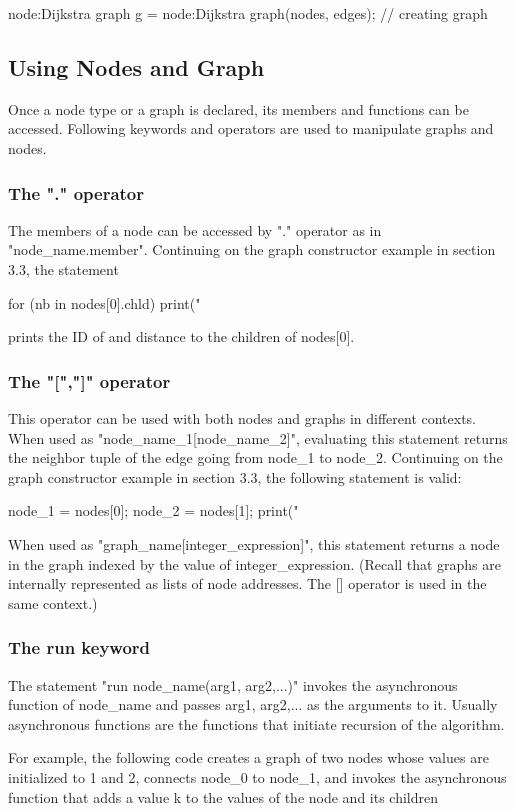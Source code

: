 \documentclass{article}
\begin{document}
node:Dijkstra graph g = node:Dijkstra graph(nodes, edges); // creating graph
\subsection{Using Nodes and Graph}
Once a node type or a graph is declared, its members and functions can be accessed. Following keywords and operators are used to manipulate graphs and nodes.
\subsubsection{The "." operator}
The members of a node can be accessed by "." operator as in "node\_name.member". Continuing on the graph constructor example in section 3.3, the statement

for (nb in nodes[0].chld){
    print("%
}

prints the ID of and distance to the children of nodes[0].
\subsubsection{The "[","]" operator}
This operator can be used with both nodes and graphs in different contexts.
When used as "node\_name\_1[node\_name\_2]", evaluating this statement returns
the neighbor tuple of the edge going from node\_1 to node\_2. Continuing on the graph constructor example in section 3.3, the following statement is valid:

node\_1 = nodes[0];
node\_2 = nodes[1];
print("%

When used as "graph\_name[integer\_expression]", this statement returns a node
in the graph indexed by the value of integer\_expression. (Recall that graphs are internally represented as lists of node addresses. The [] operator is used in the same context.)
\subsubsection{The run keyword}
The statement "run node\_name(arg1, arg2,...)" invokes the asynchronous
function of node\_name and passes arg1, arg2,... as the arguments to it. Usually asynchronous functions are the functions that initiate recursion of the algorithm.

For example, the following code creates a graph of two nodes whose values are
initialized to 1 and 2, connects node\_0 to node\_1, and invokes the asynchronous function that adds a value k to the values of the node and its children
\end{document}
